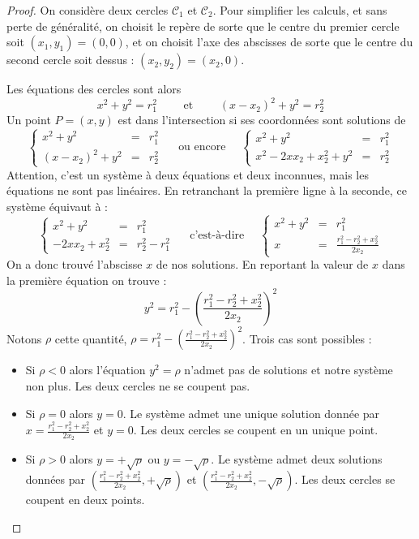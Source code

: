 \documentclass[class=report,crop=false]{standalone}
\begin{document}
\begin{proof}
On considère deux cercles $\mathcal{C}_1$ et $\mathcal{C}_2$.
Pour simplifier les calculs, et sans perte de généralité, on choisit le repère de sorte que le centre du premier cercle
soit $(x_1,y_1) = (0,0)$, et on choisit l'axe des abscisses de sorte que le centre du second cercle soit dessus :
$(x_2,y_2)=(x_2,0)$. 


Les équations des cercles sont alors
$$x^2 + y^2 = r_1^2 \qquad \text{ et } \qquad (x-x_2)^2 + y^2 = r_2^2$$
Un point $P = (x,y)$ est dans l'intersection si ses coordonnées sont solutions de 
$$\left\{\begin{array}{rcl}
x^2 + y^2 &=& r_1^2 \\
(x-x_2)^2 + y^2 &=& r_2^2
\end{array}\right.
\quad \text{ ou encore }\quad
\left\{\begin{array}{rcl}
x^2 + y^2 &=& r_1^2 \\
x^2-2xx_2 +x_2^2 + y^2 &=& r_2^2
\end{array}\right.$$
Attention, c'est un système à deux équations et deux inconnues, mais les équations ne sont pas linéaires.
En retranchant la première ligne à la seconde, ce système équivaut à :
$$\left\{\begin{array}{rcl}
x^2 + y^2 &=& r_1^2 \\
-2xx_2 + x_2^2 &=& r_2^2-r_1^2
\end{array}\right.
\quad \text{ c'est-à-dire }\quad
\left\{\begin{array}{rcl}
x^2 + y^2 &=& r_1^2 \\
x &=& \frac{r_1^2-r_2^2+x_2^2}{2x_2}
\end{array}\right.$$
On a donc trouvé l'abscisse $x$ de nos solutions. En reportant la valeur de $x$ dans la première équation
on trouve :
$$y^2 = r_1^2 - \left(\frac{r_1^2-r_2^2+x_2^2}{2x_2}\right)^2$$
Notons $\rho$ cette quantité, $\rho = r_1^2 - \left(\frac{r_1^2-r_2^2+x_2^2}{2x_2}\right)^2$.
Trois cas sont possibles :
\begin{itemize}
  \item Si $\rho < 0$ alors l'équation $y^2 = \rho$ n'admet pas de solutions et notre système non plus.
  Les deux cercles ne se coupent pas.
  
  \item Si $\rho = 0$ alors $y=0$. Le système admet une unique solution
  donnée par $x= \frac{r_1^2-r_2^2+x_2^2}{2x_2}$ et $y=0$. Les deux cercles se coupent en un unique point.
  
  \item Si $\rho > 0$ alors $y = +\sqrt \rho$ ou $y=-\sqrt \rho$.
  Le système admet deux solutions données par $\left(\frac{r_1^2-r_2^2+x_2^2}{2x_2},+\sqrt \rho\right)$
  et  $\left(\frac{r_1^2-r_2^2+x_2^2}{2x_2},-\sqrt \rho\right)$. Les deux cercles se coupent en deux points.
\end{itemize}
  
\end{proof}
\end{document}

